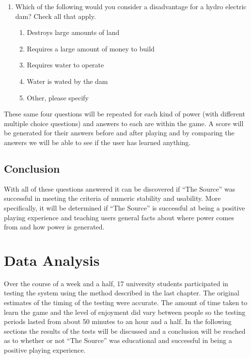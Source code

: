 \documentclass[msc,oneside]{ubcthesis}%
\begin{document}
\begin{enumerate}
    \item Which of the following would you consider a disadvantage for a hydro electric dam? Check all  that apply.

    \begin{enumerate}
            \item Destroys large amounts of land
            \item Requires a large amount of money to build
            \item Requires water to operate
            \item Water is wated by the dam
            \item Other, please specify

    \end{enumerate}

  \end{enumerate}

  These same four questions will be repeated for each kind of power (with different multiple choice questions) and answers to each are within the game. A score will be generated for their answers before and after playing and by comparing the answers we will be able to see if the user has learned anything.

\section{Conclusion}
      With all of these questions answered it can be discovered if ``The Source'' was successful in meeting the criteria of numeric stability and usability. More specifically, it will be determined if “The Source” is successful at being a positive playing experience and teaching users general facts about where power comes from and how power is generated.




\chapter{Data Analysis}

\indent Over the course of a week and a half, 17 university students participated in testing the system using the method described in the last chapter. The original estimates of the timing of the testing were accurate. The amount of time taken to learn the game and the level of enjoyment did vary between people so the testing periods lasted from about 50 minutes to an hour and a half. In the following sections the results of the tests will be discussed and a conclusion will be reached as to whether or not ``The Source'' was educational and successful in being a positive playing experience.
\end{document}
